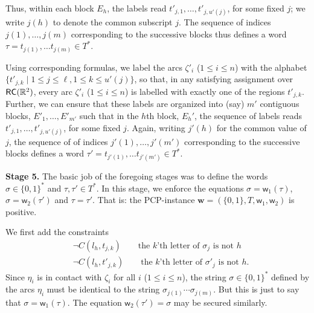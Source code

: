 \documentclass{article}
\newcommand{\R}{\mathbb{R}}
\newcommand{\RC}{{\sf RC}}
\newcommand{\fw}{\mathsf{w}}
\newcommand{\fW}{\mathbf{w}}
\newcommand{\set}[1]{\{#1\}}
\begin{document}
Thus, within each block $E_h$, the labels read $t'_{j,1}, \ldots,
t'_{j,u'(j)}$, for some fixed $j$; we write $j(h)$ to denote the
common subscript $j$.  The sequence of indices $j(1), \ldots, j(m)$
corresponding to the successive blocks thus defines a word $\tau =
t_{j(1)}, \ldots t_{j(m)} \in T^*$.

Using corresponding formulas, we label the arcs $\zeta'_i$ ($1 \leq i
\leq n$) with the alphabet $\set{t'_{j,k} \mid 1 \leq j \leq \ell, 1
  \leq k \leq u'(j)}$, so that, in any satisfying assignment over
$\RC(\R^2)$, every arc $\zeta'_i$ ($1 \leq i \leq n$) is labelled with
exactly one of the regions $t'_{j,k}$. Further, we can ensure that
these labels are organized into (say) $m'$ contiguous blocks, $E'_1,
\ldots, E'_{m'}$ such that in the $h$th block, $E_h'$, the sequence of
labels reads $t'_{j,1}, \ldots, t'_{j,u'(j)}$, for some fixed
$j$. Again, writing $j'(h)$ for the common value of $j$, the sequence
of of indices $j'(1), \ldots, j'(m')$ corresponding to the successive
blocks defines a word $\tau' = t_{j'(1)}, \ldots t_{j'(m')} \in T^*$.


\bigskip

\noindent
\textbf{Stage 5.}  The basic job of the foregoing stages was to define
the words $\sigma \in \set{0,1}^*$ and $\tau, \tau' \in T^*$.  In this
stage, we enforce the equations $\sigma = \fw_1(\tau)$, $\sigma =
\fw_2(\tau')$ and $\tau = \tau'$. That is: the PCP-instance $\fW =
(\set{0,1}, T, \fw_1, \fw_2)$ is positive.

We first add the constraints
\begin{align*}
& \neg C(l_h, t_{j,k}) \qquad \text{the $k$'th letter of $\sigma_j$ is not $h$}\\
& \neg C(l_h, t'_{j,k}) \qquad \text{the $k$'th letter of $\sigma'_j$ is not $h$}.
\end{align*}
Since $\eta_i$ is in contact with $\zeta_i$ for all $i$ ($1 \leq i \leq
n$), the string $\sigma \in \set{0,1}^*$ defined by the arcs $\eta_i$
must be identical to the string $\sigma_{j(1)} \cdots
\sigma_{j(m)}$. But this is just to say that $\sigma = \fw_1(\tau)$.
The equation $\fw_2(\tau') = \sigma$ may be secured similarly.
\end{document}
